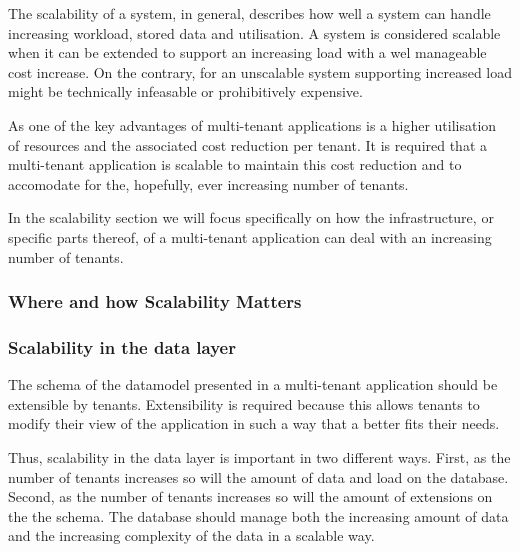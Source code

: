 The scalability of a system, in general, describes how well a system can handle increasing workload, stored data and utilisation.
A system is considered scalable when it can be extended to support an increasing load with a wel manageable cost increase.
On the contrary, for an unscalable system supporting increased load might be technically infeasable or prohibitively expensive.\cite{bondi2000scalability}

As one of the key advantages of multi-tenant applications is a higher utilisation of resources and the associated cost reduction per tenant.\cite{bezemer2010multi} 
It is required that a multi-tenant application is scalable to maintain this cost reduction and to accomodate for the, hopefully, ever increasing number of tenants.

In the scalability section we will focus specifically on how the infrastructure, or specific parts thereof, of a multi-tenant application can deal with an increasing number of tenants.

\subsubsection{Where and how Scalability Matters}


\subsubsection{Scalability in the data layer}
The schema of the datamodel presented in a multi-tenant application should be extensible by tenants.
Extensibility is required because this allows tenants to modify their view of the application in such a way that a better fits their needs.

Thus, scalability in the data layer is important in two different ways.
First, as the number of tenants increases so will the amount of data and load on the database.
Second, as the number of tenants increases so will the amount of extensions on the the schema. 
The database should manage both the increasing amount of data and the increasing complexity of the data in a scalable way.

